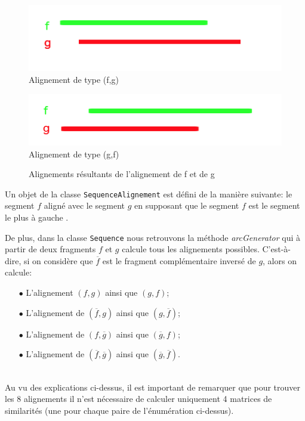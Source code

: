 \begin{figure}
	\begin{minipage}[r]{.46\linewidth}
		\begin{center}
		\includegraphics[scale= 0.50]{(f,g).png}
		Alignement de type (f,g)
	\end{center}
	   \end{minipage} \hfill
	   \begin{minipage}[c]{.46\linewidth}
		\begin{center}
			\includegraphics[scale= 0.50]{(g,f).png}
			Alignement de type (g,f)
		\end{center}
			  \end{minipage}
		\caption{Alignements résultants de l'alignement de f et de g}
		\label{fig:alignementType}
\end{figure}


Un objet de la classe \verb|SequenceAlignement| est défini de la manière
suivante: le segment $f$ aligné avec le segment $g$ en supposant que le
segment $f$ est le segment le plus à \og gauche \fg.

De plus, dans la classe \verb|Sequence| nous retrouvons la méthode \emph{arcGenerator} qui à partir de deux fragments $f$ et $g$ calcule tous les alignements possibles. C'est-à-dire, si on considère que $\overline{f}$ est le fragment complémentaire inversé de $g$, alors on calcule:\\
\begin{itemize}
	\item[$\bullet$] L'alignement $(f,g)$ ainsi que $(g,f)$;
	\item[$\bullet$] L'alignement de $(\overline{f},g)$ ainsi que $(g, \overline{f})$;
	\item[$\bullet$] L'alignement de $(f, \overline{g})$ ainsi que $(\overline{g},f)$;
	\item[$\bullet$] L'alignement de $(\overline{f}, \overline{g})$ ainsi que $(\overline{g}, \overline{f})$.
\end{itemize}
$ $\\
Au vu des explications ci-dessus, il est important de remarquer que pour trouver les 8 alignements il n'est nécessaire de calculer uniquement 4 matrices de similarités (une pour chaque paire de l'énumération ci-dessus).\\

